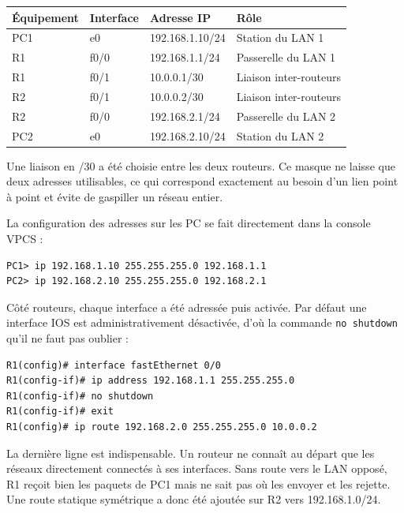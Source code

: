 \documentclass[11pt,a4paper]{article}
\begin{document}
\begin{center}
\begin{tabular}{llll}
\hline
\textbf{\'Equipement} & \textbf{Interface} & \textbf{Adresse IP} & \textbf{R\^ole} \\
\hline
PC1 & e0      & 192.168.1.10/24 & Station du LAN 1 \\
R1  & f0/0    & 192.168.1.1/24  & Passerelle du LAN 1 \\
R1  & f0/1    & 10.0.0.1/30     & Liaison inter-routeurs \\
R2  & f0/1    & 10.0.0.2/30     & Liaison inter-routeurs \\
R2  & f0/0    & 192.168.2.1/24  & Passerelle du LAN 2 \\
PC2 & e0      & 192.168.2.10/24 & Station du LAN 2 \\
\hline
\end{tabular}
\end{center}

Une liaison en /30 a \'et\'e choisie entre les deux routeurs. Ce masque ne laisse que deux adresses
utilisables, ce qui correspond exactement au besoin d'un lien point \`a point et \'evite de gaspiller un
r\'eseau entier.

La configuration des adresses sur les PC se fait directement dans la console VPCS :

\begin{lstlisting}
PC1> ip 192.168.1.10 255.255.255.0 192.168.1.1
PC2> ip 192.168.2.10 255.255.255.0 192.168.2.1
\end{lstlisting}

C\^ot\'e routeurs, chaque interface a \'et\'e adress\'ee puis activ\'ee. Par d\'efaut une interface IOS est
administrativement d\'esactiv\'ee, d'o\`u la commande \texttt{no shutdown} qu'il ne faut pas oublier :

\begin{lstlisting}
R1(config)# interface fastEthernet 0/0
R1(config-if)# ip address 192.168.1.1 255.255.255.0
R1(config-if)# no shutdown
R1(config-if)# exit
R1(config)# ip route 192.168.2.0 255.255.255.0 10.0.0.2
\end{lstlisting}

La derni\`ere ligne est indispensable. Un routeur ne conna\^it au d\'epart que les r\'eseaux directement
connect\'es \`a ses interfaces. Sans route vers le LAN oppos\'e, R1 re\c{c}oit bien les paquets de PC1 mais
ne sait pas o\`u les envoyer et les rejette. Une route statique sym\'etrique a donc \'et\'e ajout\'ee sur R2
vers 192.168.1.0/24.
\end{document}
